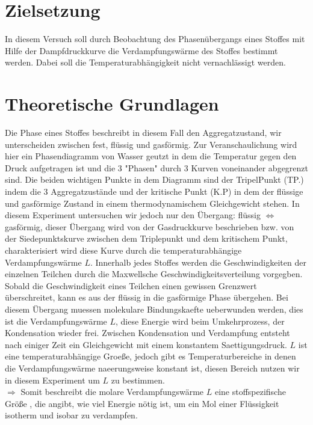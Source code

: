 \section{Zielsetzung}

In diesem Versuch soll durch Beobachtung des Phasenübergangs eines Stoffes mit Hilfe der Dampfdruckkurve die 
Verdampfungswärme des Stoffes bestimmt werden. Dabei soll die Temperaturabhängigkeit nicht vernachlässigt werden.

\section{Theoretische Grundlagen}


Die \glqq Phase\grqq{} eines Stoffes beschreibt in diesem Fall den Aggregatzustand, wir unterscheiden zwischen fest, flüssig und gasförmig.
Zur Veranschaulichung wird hier ein Phasendiagramm von Wasser geutzt in dem die Temperatur gegen den Druck aufgetragen ist und die 3 "Phasen" 
durch 3 Kurven voneinander abgegrenzt sind. Die beiden wichtigen Punkte in dem Diagramm sind der TripelPunkt (TP.) indem die 
3 Aggregatzustände und der kritische Punkt (K.P) in dem der flüssige und gasförmige Zustand in einem 
thermodynamischem Gleichgewicht stehen.
In diesem Experiment untersuchen wir jedoch nur den Übergang: flüssig $\Leftrightarrow$ gasförmig, dieser Übergang wird von der 
Gasdruckkurve beschrieben bzw. von der Siedepunktskurve zwischen dem Triplepunkt und dem kritischem Punkt, charakterisiert wird diese 
Kurve durch die temperaturabhängige Verdampfungswärme $L$. Innerhalb jedes Stoffes werden die Geschwindigkeiten der einzelnen Teilchen
durch die Maxwellsche Geschwindigkeitsverteilung vorgegben. Sobald die Geschwindigkeit eines Teilchen einen gewissen Grenzwert 
überschreitet, kann es aus der flüssig in die gasförmige Phase übergehen. Bei diesem Übergang muessen molekulare Bindungskaefte ueberwunden
werden, dies ist die Verdampfungswärme $L$, diese Energie wird beim Umkehrprozess, der Kondensation wieder frei. Zwischen 
Kondensation und Verdampfung entsteht nach einiger Zeit ein Gleichgewicht mit einem konstantem Saettigungsdruck.
$L$ ist eine temperaturabhängige Groeße, jedoch gibt es Temperaturbereiche in denen die Verdampfungswärme naeerungsweise konstant ist, 
diesen Bereich nutzen wir in diesem Experiment um $L$ zu bestimmen.
\\$\Rightarrow$ Somit beschreibt die molare Verdampfungswärme $L$ eine stoffspezifische Größe , die angibt, wie viel Energie nötig ist,
um ein Mol einer Flüssigkeit isotherm und isobar zu verdampfen.\\


